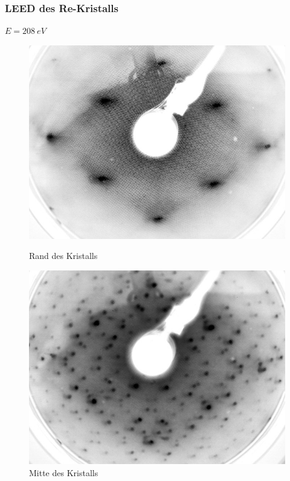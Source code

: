 \documentclass{beamer}
\begin{document}
\begin{frame}
\frametitle{LEED des Re-Kristalls}
$E=\SI{208}{eV}$
\begin{figure}[htbp]
	\begin{minipage}[b]{0.45\textwidth}
	\includegraphics[width=\textwidth]{bilder/unbedampft_E207}
	\caption*{Rand des Kristalls}
	\end{minipage}
	\hspace{0.2cm}
	\begin{minipage}[b]{0.45\textwidth}
	\includegraphics[width=\textwidth]{bilder/unbedampft_E207_MitteKristall.jpg}
	\caption*{Mitte des Kristalls}
	\end{minipage}
\end{figure}
\end{frame}
\end{document}

